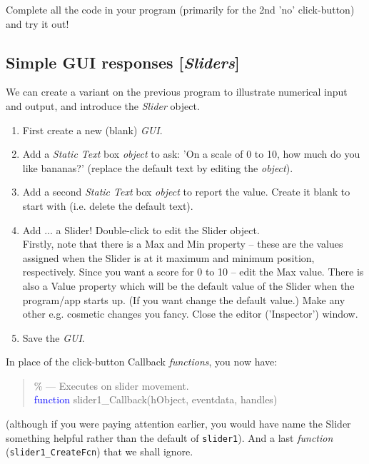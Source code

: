 \documentclass{tufte-book} %
\newenvironment{docspec}{\begin{quotation}\ttfamily\parskip0pt\parindent0pt\ignorespaces}{\end{quotation}}
\begin{document}
Complete all the code in your program (primarily for the 2nd 'no' click-button) and try it out!

\newpage


\subsection{Simple GUI responses [\textit{Sliders}]}

We can create a variant on the previous program to illustrate numerical input and output, and introduce the \textit{Slider} object.

\begin{enumerate}
\setlength{\itemindent}{.2in}
\item First create a new (blank) \textit{GUI}.
\item Add a \textit{Static Text} box \textit{object} to ask: 'On a scale of 0 to 10, how much do you like bananas?' (replace the default text by editing the \textit{object}).
\item Add a second \textit{Static Text} box \textit{object} to report the value. Create it blank to start with (i.e. delete the default text).
\item Add ... a \textsf{Slider}! Double-click to edit the \textsf{Slider} object.
\\Firstly, note that there is a \textsf{Max} and \textsf{Min} property -- these are the values assigned when the \textsf{Slider} is at it maximum and minimum position, respectively. Since you want a score for 0 to 10 -- edit the \textsf{Max} value. There is also a \textsf{Value} property which will be the default value of the \textsf{Slider} when the program/app starts up. (If you want change the default value.) Make any other e.g. cosmetic changes you fancy. Close the editor ('\textsf{Inspector}') window.
\item Save the \textit{GUI}.
\end{enumerate}

In place of the click-button Callback \textit{functions},  you now have:
\begin{docspec}
\textcolor[rgb]{0,0.501961,0}{\% --- Executes on slider movement.}
\\\textcolor{blue}{function} slider1\_Callback(hObject, eventdata, handles)
\end{docspec}
(although if you were paying attention earlier, you would have name the \textsf{Slider} something helpful rather than the default of \texttt{slider1}). And a last \textit{function} (\texttt{slider1\_CreateFcn}) that we shall ignore.
\end{document}
